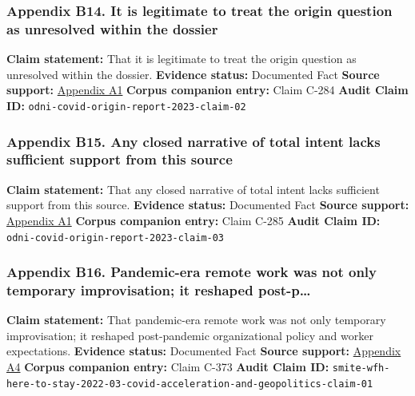 \documentclass[
  american,
  11pt,
  letterpaper,
]{article}
\begin{document}
\subsubsection{Appendix B14. It is legitimate to treat the origin
question as unresolved within the
dossier}\label{appendix-b14-it-is-legitimate-to-treat-the-origin-question-as-unresolved-within-the-dossier}

\textbf{Claim statement:} That it is legitimate to treat the origin
question as unresolved within the dossier. \textbf{Evidence status:}
Documented Fact \textbf{Source support:}
\hyperref[appendix-a1-report-on-potential-links-between-the-wuhan-institute-of-virology-and-the-origins-of-covid-19]{Appendix
A1} \textbf{Corpus companion entry:} Claim C-284 \textbf{Audit Claim
ID:} \texttt{odni-covid-origin-report-2023-claim-02}

\subsubsection{Appendix B15. Any closed narrative of total intent lacks
sufficient support from this
source}\label{appendix-b15-any-closed-narrative-of-total-intent-lacks-sufficient-support-from-this-source}

\textbf{Claim statement:} That any closed narrative of total intent
lacks sufficient support from this source. \textbf{Evidence status:}
Documented Fact \textbf{Source support:}
\hyperref[appendix-a1-report-on-potential-links-between-the-wuhan-institute-of-virology-and-the-origins-of-covid-19]{Appendix
A1} \textbf{Corpus companion entry:} Claim C-285 \textbf{Audit Claim
ID:} \texttt{odni-covid-origin-report-2023-claim-03}

\subsubsection{Appendix B16. Pandemic-era remote work was not only
temporary improvisation; it reshaped
post-p\ldots{}}\label{appendix-b16-pandemic-era-remote-work-was-not-only-temporary-improvisation-it-reshaped-post-p}

\textbf{Claim statement:} That pandemic-era remote work was not only
temporary improvisation; it reshaped post-pandemic organizational policy
and worker expectations. \textbf{Evidence status:} Documented Fact
\textbf{Source support:}
\hyperref[appendix-a4-work-from-home-is-here-to-stay-call-for-flexibility-in-post-pandemic-work-policies]{Appendix
A4} \textbf{Corpus companion entry:} Claim C-373 \textbf{Audit Claim
ID:}
\texttt{smite-wfh-here-to-stay-2022-03-covid-acceleration-and-geopolitics-claim-01}
\end{document}
